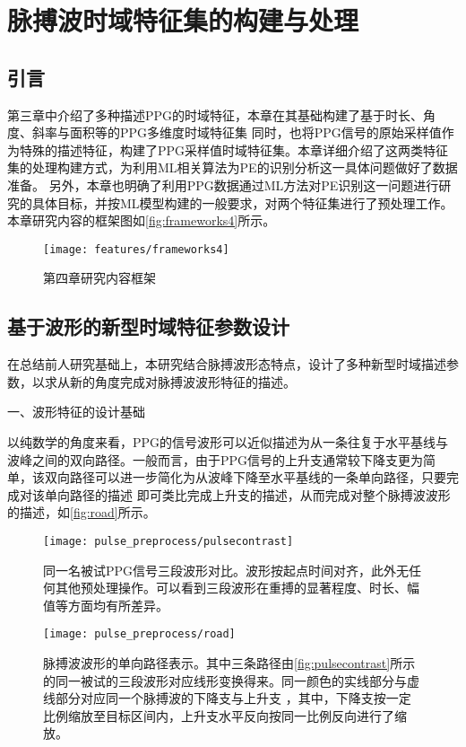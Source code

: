 \chapter{脉搏波时域特征集的构建与处理}
\section{引言}
第三章中介绍了多种描述PPG的时域特征，本章在其基础构建了基于时长、角度、斜率与面积等的PPG多维度时域特征集
同时，也将PPG信号的原始采样值作为特殊的描述特征，构建了PPG采样值时域特征集。本章详细介绍了这两类特征集的处理构建方式，为利用ML相关算法为PE的识别分析这一具体问题做好了数据准备。
另外，本章也明确了利用PPG数据通过ML方法对PE识别这一问题进行研究的具体目标，并按ML模型构建的一般要求，对两个特征集进行了预处理工作。
本章研究内容的框架图如\autoref{fig:frameworks4}所示。

\begin{figure}[htbp]
  \centering
  \texttt{[image: features/frameworks4]}
  \caption{\label{fig:frameworks4}第四章研究内容框架}
\end{figure}


\section{基于波形的新型时域特征参数设计}
在总结前人研究基础上，本研究结合脉搏波形态特点，设计了多种新型时域描述参数，以求从新的角度完成对脉搏波波形特征的描述。

一、波形特征的设计基础

以纯数学的角度来看，PPG的信号波形可以近似描述为从一条往复于水平基线与波峰之间的双向路径。一般而言，由于PPG信号的上升支通常较下降支更为简单，该双向路径可以进一步简化为从波峰下降至水平基线的一条单向路径，只要完成对该单向路径的描述
即可类比完成上升支的描述，从而完成对整个脉搏波波形的描述，如\autoref{fig:road}所示。
\begin{figure}[htbp]
  \centering
  \texttt{[image: pulse\_preprocess/pulsecontrast]}
  \caption[同一名被试PPG信号三段波形对比]{\label{fig:pulsecontrast}同一名被试PPG信号三段波形对比。波形按起点时间对齐，此外无任何其他预处理操作。可以看到三段波形在重搏的显著程度、时长、幅值等方面均有所差异。}
\end{figure}

\begin{figure}[htbp]
    \centering
    \texttt{[image: pulse\_preprocess/road]}
    \caption[脉搏波波形的单向路径表示]{\label{fig:road}脉搏波波形的单向路径表示。其中三条路径由\autoref{fig:pulsecontrast}所示的同一被试的三段波形对应线形变换得来。同一颜色的实线部分与虚线部分对应同一个脉搏波的下降支与上升支
    ，其中，下降支按一定比例缩放至目标区间内，上升支水平反向按同一比例反向进行了缩放。}
\end{figure}

